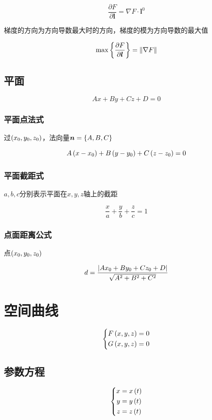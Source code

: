 \documentclass{article}
\begin{document}
\[\frac{\partial F}{\partial\boldsymbol l}=\nabla F\cdot\boldsymbol l^0\]

梯度的方向为方向导数最大时的方向，梯度的模为方向导数的最大值

\[\max\left\{\frac{\partial F}{\partial\boldsymbol l}\right\}=\left\Vert\nabla F\right\Vert\]

\subsection{平面}

\[Ax+By+Cz+D=0\]

\subsubsection{平面点法式}

过$\left(x_0,y_0,z_0\right)$，法向量$\boldsymbol n=\left\{A,B,C\right\}$

\[A\left(x-x_0\right)+
    B\left(y-y_0\right)+
    C\left(z-z_0\right)=0\]

\subsubsection{平面截距式}

$a,b,c$分别表示平面在$x,y,z$轴上的截距

\[\frac xa+\frac yb+\frac zc=1\]

\subsubsection{点面距离公式}

点$\left(x_0,y_0,z_0\right)$

\[d=\frac{\left|Ax_0+By_0+Cz_0+D\right|}{\sqrt{A^2+B^2+C^2}}\]

\section{空间曲线}

\[\left\{\begin{aligned}
        F\left(x,y,z\right) & =0 \\
        G\left(x,y,z\right) & =0
    \end{aligned}\right.\]

\subsection{参数方程}

\[\left\{\begin{aligned}
        x & =x\left(t\right) \\
        y & =y\left(t\right) \\
        z & =z\left(t\right)
    \end{aligned}\right.\]
\end{document}
